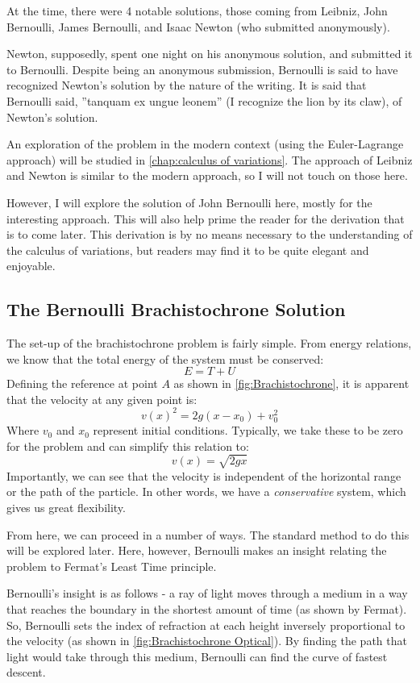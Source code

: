 At the time, there were 4 notable solutions, those coming from Leibniz, John Bernoulli, James Bernoulli, and Isaac Newton (who submitted anonymously). 

Newton, supposedly, spent one night on his anonymous solution, and submitted it to Bernoulli. Despite being an anonymous submission, Bernoulli is said to have recognized Newton's solution by the nature of the writing. It is said that Bernoulli said, ''tanquam ex ungue leonem'' (I recognize the lion by its claw), of Newton's solution.

An exploration of the problem in the modern context (using the Euler-Lagrange approach) will be studied in \autoref{chap:calculus of variations}. The approach of Leibniz and Newton is similar to the modern approach, so I will not touch on those here.

However, I will explore the solution of John Bernoulli here, mostly for the interesting approach. This will also help prime the reader for the derivation that is to come later. This derivation is by no means necessary to the understanding of the calculus of variations, but readers may find it to be quite elegant and enjoyable.

\subsection{The Bernoulli Brachistochrone Solution}
The set-up of the \gls{brachistochrone} problem is fairly simple. From energy relations, we know that the total energy of the system must be conserved:
$$E=T+U$$
Defining the reference at point $A$ as shown in \autoref{fig:Brachistochrone}, it is apparent that the velocity at any given point is:
$$v(x)^2=2g(x-x_0)+v_0^2$$
Where $v_0$ and $x_0$ represent initial conditions. Typically, we take these to be zero for the problem and can simplify this relation to:
$$v(x)=\sqrt{2gx}$$
Importantly, we can see that the velocity is independent of the horizontal range or the path of the particle. In other words, we have a \textit{conservative} system, which gives us great flexibility.

From here, we can proceed in a number of ways. The standard method to do this will be explored later. Here, however, Bernoulli makes an insight relating the problem to Fermat's Least Time principle.

Bernoulli's insight is as follows - a ray of light moves through a medium in a way that reaches the boundary in the shortest amount of time (as shown by Fermat). So, Bernoulli sets the index of refraction at each height inversely proportional to the velocity (as shown in \autoref{fig:Brachistochrone Optical}). By finding the path that light would take through this medium, Bernoulli can find the curve of fastest descent.

